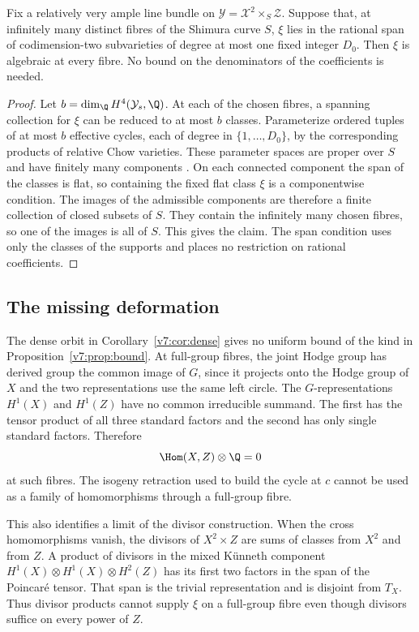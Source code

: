 \begin{proposition}\label{v7:prop:bound}
Fix a relatively very ample line bundle on \(\mathcal Y=\mathcal X^2\times_S\mathcal Z\). Suppose that, at infinitely many distinct fibres of the Shimura curve \(S\), \(\xi\) lies in the rational span of codimension-two subvarieties of degree at most one fixed integer \(D_0\). Then \(\xi\) is algebraic at every fibre. No bound on the denominators of the coefficients is needed.
\end{proposition}
\begin{proof}
Let \(b=\dim_\Q H^4(\mathcal Y_s,\Q)\). At each of the chosen fibres, a spanning collection for \(\xi\) can be reduced to at most \(b\) classes. Parameterize ordered tuples of at most \(b\) effective cycles, each of degree in \(\{1,\ldots,D_0\}\), by the corresponding products of relative Chow varieties. These parameter spaces are proper over \(S\) and have finitely many components \cite{Ful98}. On each connected component the span of the classes is flat, so containing the fixed flat class \(\xi\) is a componentwise condition. The images of the admissible components are therefore a finite collection of closed subsets of \(S\). They contain the infinitely many chosen fibres, so one of the images is all of \(S\). This gives the claim. The span condition uses only the classes of the supports and places no restriction on rational coefficients.
\end{proof}

\subsection{The missing deformation}

The dense orbit in Corollary~\ref{v7:cor:dense} gives no uniform bound of the kind in Proposition~\ref{v7:prop:bound}. At full-group fibres, the joint Hodge group has derived group the common image of \(G\), since it projects onto the Hodge group of \(X\) and the two representations use the same left circle. The \(G\)-representations \(H^1(X)\) and \(H^1(Z)\) have no common irreducible summand. The first has the tensor product of all three standard factors and the second has only single standard factors. Therefore
\[
 \Hom(X,Z)\otimes\Q=0
\]
at such fibres. The isogeny retraction used to build the cycle at \(c\) cannot be used as a family of homomorphisms through a full-group fibre.

This also identifies a limit of the divisor construction. When the cross homomorphisms vanish, the divisors of \(X^2\times Z\) are sums of classes from \(X^2\) and from \(Z\). A product of divisors in the mixed K\"unneth component \(H^1(X)\otimes H^1(X)\otimes H^2(Z)\) has its first two factors in the span of the Poincar\'e tensor. That span is the trivial representation and is disjoint from \(T_X\). Thus divisor products cannot supply \(\xi\) on a full-group fibre even though divisors suffice on every power of \(Z\).

